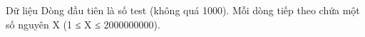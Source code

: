 Dữ liệu
Dòng đầu tiên là số test (không quá 1000). Mỗi dòng tiếp theo chứa một số nguyên X (1 ≤ X ≤ 2000000000).